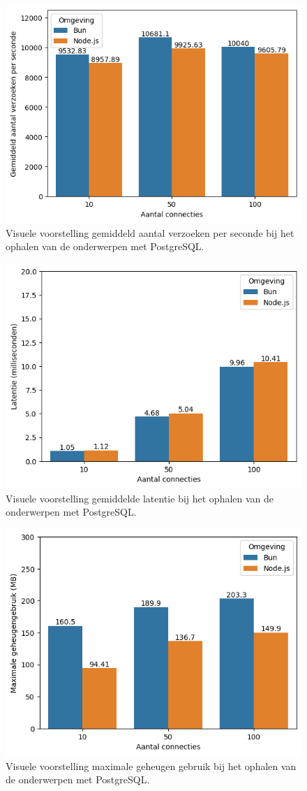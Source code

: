   
  \begin{figure}[H]
    \centering
    \includegraphics[width=0.7\columnwidth]{graphics/GetPostgresVerzoeken.png}
    \caption[Aantal verzoeken per seconde GET verzoek met PostgreSQL]{\label{fig:getaantalverzoekenpostgres}Visuele voorstelling gemiddeld aantal verzoeken per seconde bij het ophalen van de onderwerpen met PostgreSQL.}
  \end{figure}
  \begin{figure}[H]
    \centering
    \includegraphics[width=0.7\columnwidth]{graphics/GetPostgresLatentie.png}
    \caption[Latentie GET verzoek met PostgreSQL]{\label{fig:getaantallatentienpostgres}Visuele voorstelling gemiddelde latentie bij het ophalen van de onderwerpen met PostgreSQL.}
  \end{figure}
  \begin{figure}[H]
    \centering
    \includegraphics[width=0.7\columnwidth]{graphics/GetPostgresRAM.png}
    \caption[Geheugengebruik GET verzoek met PostgreSQL]{\label{fig:getgeheugenpostgres}Visuele voorstelling maximale geheugen gebruik bij het ophalen van de onderwerpen met PostgreSQL.}
  \end{figure}

